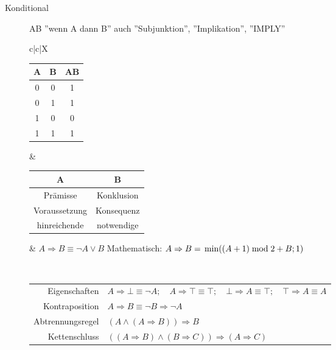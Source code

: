 \documentclass[12pt,a4paper]{article}
\begin{document}
\begin{description}
\begin{description}
			\item[Konditional] A\Rightarrow B ''wenn A dann B'' auch ''Subjunktion'', ''Implikation'', ''IMPLY'' \\
				\begin{tabularx}{\linewidth}{c|c|X}
					\begin{tabular}[t]{c|c||c}
						A & B & A\Rightarrow B \\ \hline\hline
						0 & 0 & 1 \\ \hline
						0 & 1 & 1 \\ \hline
						1 & 0 & 0 \\ \hline
						1 & 1 & 1
					\end{tabular} &
					\begin{tabular}[t]{c|c}
						A & B \\ \hline
						Prämisse & Konklusion \\
						Voraussetzung & Konsequenz \\
						hinreichende & notwendige
					\end{tabular} &
					$A \Rightarrow B \equiv \neg A \vee B$ \newline
					Mathematisch: $A \Rightarrow B = \newline \min((A + 1) \bmod 2 + B; 1)$ \\ \hline
				\end{tabularx} \\
				\begin{tabular}[t]{rl}
					Eigenschaften & $A \Rightarrow \bot \equiv \neg A; \quad A \Rightarrow \top \equiv \top; \quad \bot \Rightarrow A \equiv \top; \quad \top \Rightarrow A \equiv A$ \\
					Kontraposition & $A \Rightarrow B \equiv \neg B \Rightarrow \neg A$ \\
					Abtrennungsregel & $(A \wedge (A \Rightarrow B)) \Rightarrow B$ \\
					Kettenschluss & $((A \Rightarrow B) \wedge (B \Rightarrow C)) \Rightarrow (A \Rightarrow C)$
				\end{tabular}							
				

\end{description}
\end{description}
\end{document}
